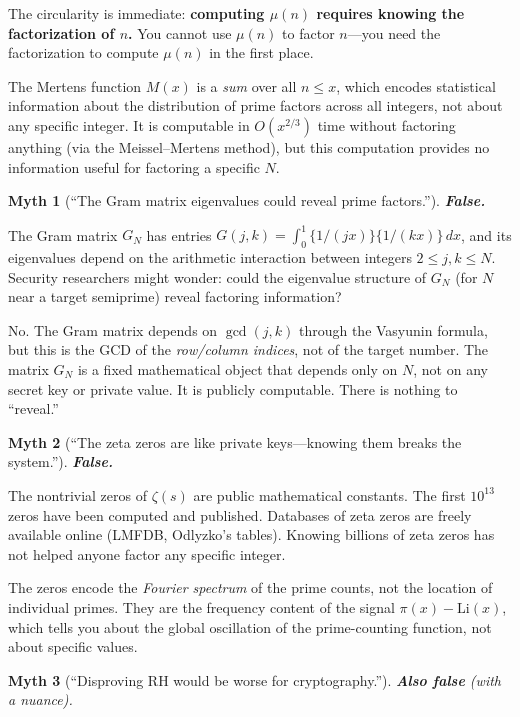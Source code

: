 \documentclass[11pt,a4paper]{article}
\theoremstyle{definition}
\theoremstyle{plain}
\newtheorem{myth}{Myth}
\newcommand{\fract}[1]{\{#1\}}
\begin{document}
The circularity is immediate: \textbf{computing $\mu(n)$ requires
knowing the factorization of $n$.} You cannot use $\mu(n)$ to factor
$n$---you need the factorization to compute $\mu(n)$ in the first
place.

The Mertens function $M(x)$ is a \emph{sum} over all $n \leq x$,
which encodes statistical information about the distribution of
prime factors across all integers, not about any specific integer.
It is computable in $O(x^{2/3})$ time without factoring anything
(via the Meissel--Mertens method), but this computation provides no
information useful for factoring a specific $N$.

\begin{myth}[``The Gram matrix eigenvalues could reveal prime
factors.'']
\label{myth:gram}
\textbf{False.}
\end{myth}

The Gram matrix $G_N$ has entries
$G(j,k) = \int_0^1 \fract{1/(jx)} \fract{1/(kx)}\,dx$, and its
eigenvalues depend on the arithmetic interaction between integers
$2 \leq j, k \leq N$. Security researchers might wonder: could the
eigenvalue structure of $G_N$ (for $N$ near a target semiprime)
reveal factoring information?

No. The Gram matrix depends on $\gcd(j,k)$ through the Vasyunin
formula, but this is the GCD of the \emph{row/column indices}, not
of the target number. The matrix $G_N$ is a fixed mathematical
object that depends only on $N$, not on any secret key or private
value. It is publicly computable. There is nothing to ``reveal.''

\begin{myth}[``The zeta zeros are like private keys---knowing them
breaks the system.'']
\label{myth:zeros}
\textbf{False.}
\end{myth}

The nontrivial zeros of $\zeta(s)$ are public mathematical constants.
The first $10^{13}$ zeros have been computed and published. Databases
of zeta zeros are freely available online (LMFDB, Odlyzko's tables).
Knowing billions of zeta zeros has not helped anyone factor any
specific integer.

The zeros encode the \emph{Fourier spectrum} of the prime counts,
not the location of individual primes. They are the frequency
content of the signal $\pi(x) - \text{Li}(x)$, which tells you
about the global oscillation of the prime-counting function, not
about specific values.

\begin{myth}[``Disproving RH would be worse for cryptography.'']
\label{myth:disproof}
\textbf{Also false} (with a nuance).
\end{myth}
\end{document}
